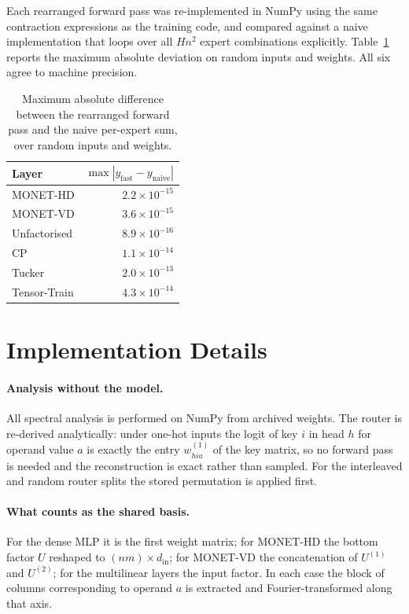 Each rearranged forward pass was re-implemented in NumPy using the same
contraction expressions as the training code, and compared against a naive
implementation that loops over all $H n^2$ expert combinations explicitly.
Table~\ref{tab:verify} reports the maximum absolute deviation on random inputs
and weights. All six agree to machine precision.

\begin{table}[h]
\centering
\caption{Maximum absolute difference between the rearranged forward pass and
the naive per-expert sum, over random inputs and weights.}
\label{tab:verify}
\begin{tabular}{lr}
\toprule
Layer & $\max |y_{\mathrm{fast}} - y_{\mathrm{naive}}|$ \\
\midrule
MONET-HD        & $2.2 \times 10^{-15}$ \\
MONET-VD        & $3.6 \times 10^{-15}$ \\
Unfactorised    & $8.9 \times 10^{-16}$ \\
CP              & $1.1 \times 10^{-14}$ \\
Tucker          & $2.0 \times 10^{-13}$ \\
Tensor-Train    & $4.3 \times 10^{-14}$ \\
\bottomrule
\end{tabular}
\end{table}

\section{Implementation Details}
\label{app:impl}

\paragraph{Analysis without the model.} All spectral analysis is performed on
NumPy from archived weights. The router is re-derived analytically: under
one-hot inputs the logit of key $i$ in head $h$ for operand value $a$ is
exactly the entry $w^{(1)}_{hia}$ of the key matrix, so no forward pass is
needed and the reconstruction is exact rather than sampled. For the
interleaved and random router splits the stored permutation is applied first.

\paragraph{What counts as the shared basis.} For the dense MLP it is the first
weight matrix; for MONET-HD the bottom factor $U$ reshaped to $(nm) \times
d_{\mathrm{in}}$; for MONET-VD the concatenation of $U^{(1)}$ and $U^{(2)}$;
for the multilinear layers the input factor. In each case the block of columns
corresponding to operand $a$ is extracted and Fourier-transformed along that
axis.

